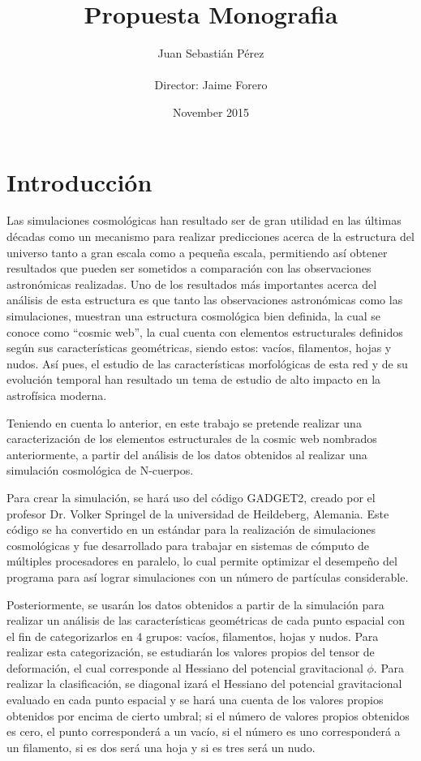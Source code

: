 \documentclass{article}
\title{Propuesta Monografia}
\author{Juan Sebastián Pérez\\ \\Director: Jaime Forero}
\date{November 2015}
\begin{document}
\maketitle

\section{Introducción}

Las simulaciones cosmológicas han resultado ser de gran utilidad en las últimas décadas como un mecanismo para realizar predicciones acerca de la estructura del universo tanto a gran escala como a pequeña escala, permitiendo así obtener resultados que pueden ser sometidos a comparación con las observaciones astronómicas realizadas. Uno de los resultados más importantes acerca del análisis de esta estructura es que tanto las observaciones astronómicas como las simulaciones, muestran una estructura cosmológica bien definida, la cual se conoce como “cosmic web”, la cual cuenta con elementos estructurales definidos según sus características geométricas, siendo estos: vacíos, filamentos, hojas y nudos. Así pues, el estudio de las características morfológicas de esta red y de su evolución temporal han resultado un tema de estudio de alto impacto en la astrofísica moderna.

Teniendo en cuenta lo anterior, en este trabajo se pretende realizar una caracterización de los elementos estructurales de la cosmic web nombrados anteriormente, a partir del análisis de los datos obtenidos al realizar una simulación cosmológica de N-cuerpos. 

Para crear la simulación, se hará uso del código GADGET2, creado por el profesor Dr. Volker Springel de la universidad de Heildeberg, Alemania. Este código se ha convertido en un estándar para la realización de simulaciones cosmológicas y fue desarrollado para trabajar en sistemas de cómputo de múltiples procesadores en paralelo, lo cual permite optimizar el desempeño del programa para así lograr simulaciones con un número de partículas considerable.

Posteriormente, se usarán los datos obtenidos a partir de la simulación para realizar un análisis de las características geométricas de cada punto espacial con el fin de categorizarlos en 4 grupos: vacíos, filamentos, hojas y nudos. Para realizar esta categorización, se estudiarán los valores propios del tensor de deformación, el cual corresponde al Hessiano del potencial gravitacional $\phi$. Para realizar la clasificación, se diagonal izará el Hessiano del potencial gravitacional evaluado en cada punto espacial y se hará una cuenta de los valores propios obtenidos por encima de cierto umbral; si el número de valores propios obtenidos es cero, el punto corresponderá a un vacío, si el número es uno corresponderá a un filamento, si es dos será una hoja y si es tres será un nudo.    
\end{document}
